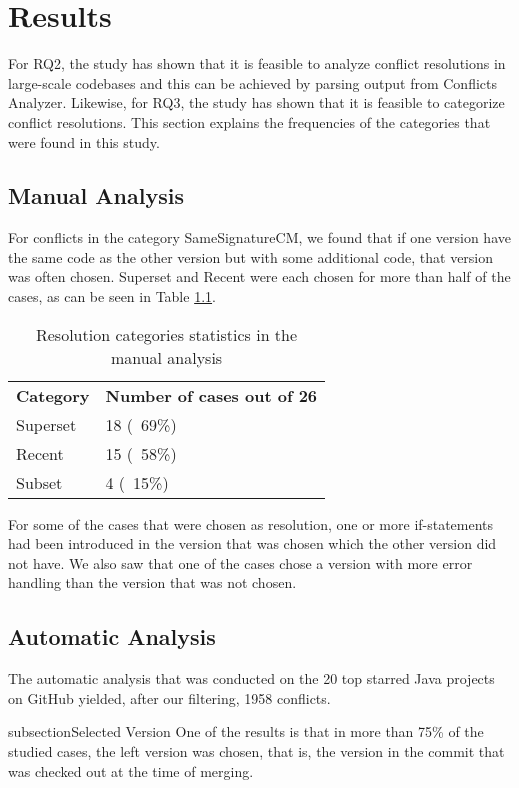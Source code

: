 \chapter{Results}
For RQ2, the study has shown that it is feasible to analyze conflict resolutions in large-scale codebases and this can be achieved by parsing output from Conflicts Analyzer. Likewise, for RQ3, the study has shown that it is feasible to categorize conflict resolutions. This section explains the frequencies of the categories that were found in this study.
\section{Manual Analysis}
For conflicts in the category SameSignatureCM, we found that if one version have the same code as the other version but with some additional code, that version was often chosen. Superset and Recent were each chosen for more than half of the cases, as can be seen in Table \ref{table:rcsitma}.

\begin{table}
\caption{Resolution categories statistics in the manual analysis}\label{table:rcsitma}
\begin{tabular}{ p{8cm} p{6cm} }
\hline
\multicolumn{1}{c}{\textbf{Category}} & \multicolumn{1}{c}{\textbf{Number of cases out of 26}}\\
Superset & 18 (~69\%)\\
Recent & 15 (~58\%)\\
Subset & 4 (~15\%)\\
\end{tabular}
\end{table}

For some of the cases that were chosen as resolution, one or more if-statements had been introduced in the version that was chosen which the other version did not have. We also saw that one of the cases chose a version with more error handling than the version that was not chosen.

\section{Automatic Analysis}
The automatic analysis that was conducted on the 20 top starred Java projects on GitHub yielded, after our filtering, 1958 conflicts.

subsection{Selected Version}
One of the results is that in more than 75\% of the studied cases, the left version was chosen, that is, the version in the commit that was checked out at the time of merging.

